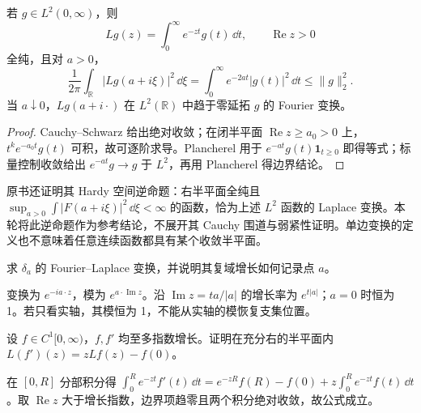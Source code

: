 \begin{proposition}\label{prop:y6-laplace}
若 $g\in L^2(0,\infty)$，则
\[
 Lg(z)=\int_0^\infty e^{-zt}g(t)\,\dd t,\qquad\operatorname{Re}z>0
\]
全纯，且对 $a>0$，
\[
 \frac1{2\pi}\int_{\mathbb R}|Lg(a+i\xi)|^2\,\dd\xi
 =\int_0^\infty e^{-2at}|g(t)|^2\,\dd t\le\|g\|_2^2.
\]
当 $a\downarrow0$，$Lg(a+i\cdot)$ 在 $L^2(\mathbb R)$ 中趋于零延拓 $g$ 的 Fourier 变换。
\end{proposition}
\begin{proof}
Cauchy--Schwarz 给出绝对收敛；在闭半平面 $\operatorname{Re}z\ge a_0>0$ 上，$t^ke^{-a_0t}g(t)$ 可积，故可逐阶求导。Plancherel 用于 $e^{-at}g(t)\mathbf1_{t\ge0}$ 即得等式；标量控制收敛给出 $e^{-at}g\to g$ 于 $L^2$，再用 Plancherel 得边界结论。
\end{proof}

原书还证明其 Hardy 空间逆命题：右半平面全纯且 $\sup_{a>0}\int|F(a+i\xi)|^2\,\dd\xi<\infty$ 的函数，恰为上述 $L^2$ 函数的 Laplace 变换。本轮将此逆命题作为参考结论，不展开其 Cauchy 围道与弱紧性证明。单边变换的定义也不意味着任意连续函数都具有某个收敛半平面。

\begin{exercise}[支集平移的指数因子]\label{ex:y6-pw-delta}
求 $\delta_a$ 的 Fourier--Laplace 变换，并说明其复域增长如何记录点 $a$。
\end{exercise}
\begin{solution}
变换为 $e^{-ia\cdot z}$，模为 $e^{a\cdot\operatorname{Im}z}$。沿 $\operatorname{Im}z=ta/|a|$ 的增长率为 $e^{t|a|}$；$a=0$ 时恒为 1。若只看实轴，其模恒为 1，不能从实轴的模恢复支集位置。
\end{solution}

\begin{exercise}\label{ex:y6-laplace-derivative}
设 $f\in C^1[0,\infty)$，$f,f'$ 均至多指数增长。证明在充分右的半平面内 $L(f')(z)=zLf(z)-f(0)$。
\end{exercise}
\begin{solution}
在 $[0,R]$ 分部积分得 $\int_0^R e^{-zt}f'(t)\,\dd t=e^{-zR}f(R)-f(0)+z\int_0^Re^{-zt}f(t)\,\dd t$。取 $\operatorname{Re}z$ 大于增长指数，边界项趋零且两个积分绝对收敛，故公式成立。
\end{solution}
